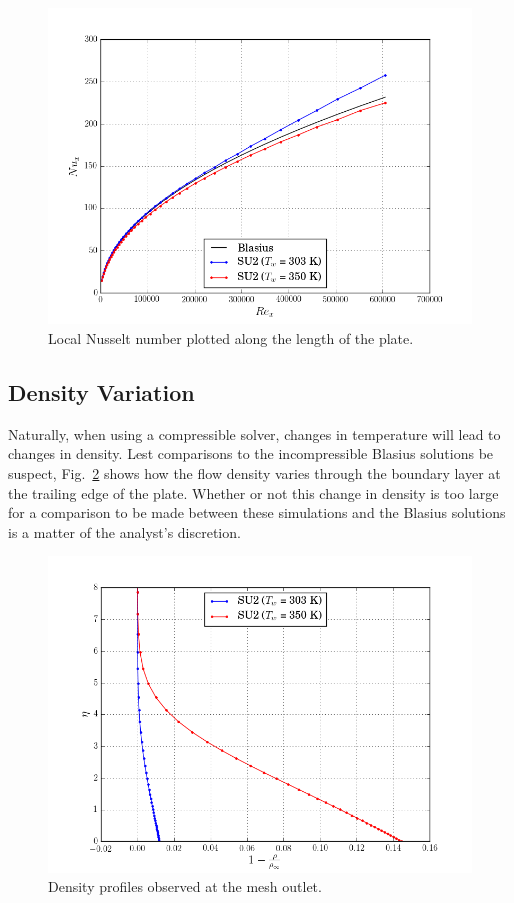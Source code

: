 \documentclass[12pt,letterpaper]{article}
\begin{document}
\begin{figure}[h] 
\centering
\includegraphics[width=\linewidth]{nu.png}
\caption{Local Nusselt number plotted along the length of the plate.}
\label{fig:Nu}
\end{figure}

\subsection*{Density Variation}
Naturally, when using a compressible solver, changes in temperature will lead to changes in density. Lest comparisons to the incompressible Blasius solutions be suspect, Fig.~\ref{fig:rho} shows how the flow density varies through the boundary layer at the trailing edge of the plate. Whether or not this change in density is too large for a comparison to be made between these simulations and the Blasius solutions is a matter of the analyst's discretion.

\begin{figure}[h] 
\centering
\includegraphics[width=\linewidth]{rho.png}
\caption{Density profiles observed at the mesh outlet.}
\label{fig:rho}
\end{figure}
\end{document}
